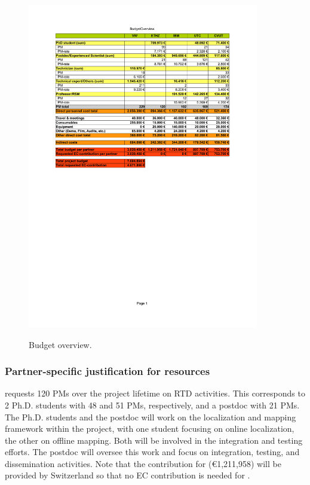 \begin{figure}[h]
  \caption{Budget overview.}
  \centering
    \includegraphics[trim=2cm 13cm 2cm 2.45cm, clip=true, width=0.9\textwidth]{pics/UP-Drive_Budget.pdf}
   \label{fig:budgetoverview}
\end{figure}


\subsubsection{Partner-specific justification for resources}

\ETHZ requests 120 PMs over the project lifetime on RTD activities. This corresponds to 2 Ph.D. students 
with 48 and 51 PMs, respectively, and a postdoc with 21 PMs. The Ph.D. students and the postdoc will work
on the localization and mapping framework within the project, with one student focusing on online localization, the other on offline mapping. Both will be involved in the integration and testing efforts. The postdoc will oversee this work and focus on integration, testing, 
and dissemination activities. Note that the contribution for \ETHZ (\euro 1,211,958) will be provided by Switzerland so that no EC contribution 
is needed for \ETHZ. 

